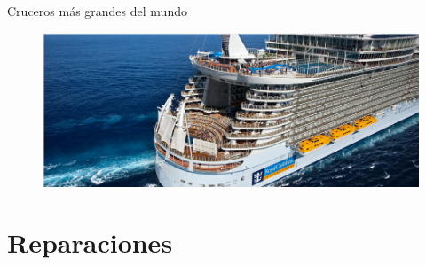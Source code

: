 \documentclass{beamer}
\begin{document}
\begin{frame}{Cruceros más grandes del mundo}

\begin{center}
\begin{figure}
	\includegraphics[scale=0.5]{allure1}
\end{figure}
\end{center}
\end{frame}
\section{Reparaciones}%
\end{document}
